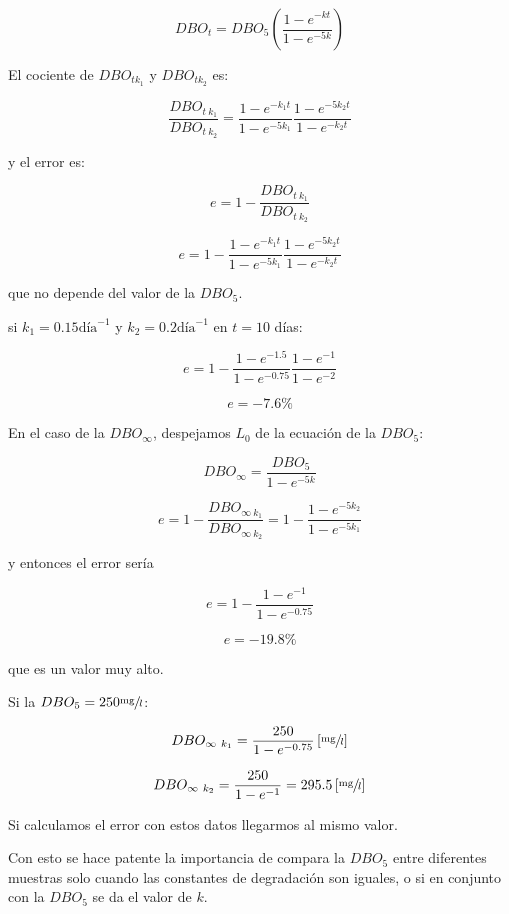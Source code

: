 \documentclass[11pt]{article}
\begin{document}
\[ DBO_t = DBO_5 \left( \frac{ 1 - e^{-kt} }{ 1 - e^{-5k} } \right) \]

El cociente de \( DBO_{ t k_1 } \) y \( DBO_{ t k_2 } \) es:

\[ \frac{DBO_{t \ k_1}}{DBO_{t \ k_2}} = \frac{ 1 - e^{ -k_1 t } }{ 1 - e^{ -5 k_1 } } \frac{ 1 - e^{ -5 k_2 t } }{ 1 - e^{ -k_2 t } } \]

y el error es:

\[ e = 1 - \frac{DBO_{t \ k_1}}{DBO_{t \ k_2}} \]

\[ \boxed{ e = 1 - \frac{ 1 - e^{ -k_1 t } }{ 1 - e^{ -5 k_1 } } \frac{ 1 - e^{ -5 k_2 t } }{ 1 - e^{ -k_2 t } } } \]

que no depende del valor de la \( DBO_5 \).

si \( k_1 = 0.15 \text{día}^{-1} \) y \( k_2 = 0.2 \text{día}^{-1} \) en \( t = 10 \) días:

\[ e = 1 - \frac{ 1 - e^{ -1.5 } }{ 1 - e^{ -0.75 } } \frac{ 1 - e^{ -1 } }{ 1 - e^{ -2 } } \]

\[ e = -7.6 \% \]

En el caso de la \( DBO_\infty \), despejamos \( L_0 \) de la ecuación de la \( DBO_5 \):

\[ DBO_\infty = \frac{DBO_5}{ 1 - e^{-5k} } \]

\[ e = 1 - \frac{DBO_{\infty \ k_1}}{DBO_{\infty \ k_2}} = 1 - \frac{ 1 - e^{-5 k_2} }{ 1 - e^{ -5 k_1 } } \]

y entonces el error sería

\[ e = 1 - \frac{ 1 - e^{-1} }{ 1 - e^{-0.75} } \]

\[ \boxed{ e = -19.8 \% } \]

que es un valor muy alto.

Si la \( DBO_5 = 250 \sfrac{\text{mg}}{l} \):

\[ DBO_{\infty \ k_1} = \frac{250}{ 1 - e^{-0.75} } \left[ \sfrac{\text{mg}}{l} \right] \]

\[ DBO_{\infty \ k_2} = \frac{250}{ 1 - e^{-1} } = 295.5 \left[ \sfrac{\text{mg}}{l} \right] \]


Si calculamos el error con estos datos llegarmos al mismo valor.

Con esto se hace patente la importancia de compara la \( DBO_5 \) entre diferentes muestras solo cuando las constantes de degradación son iguales, o si en conjunto con la \( DBO_5 \) se da el valor de \( k \).

\end{document}
